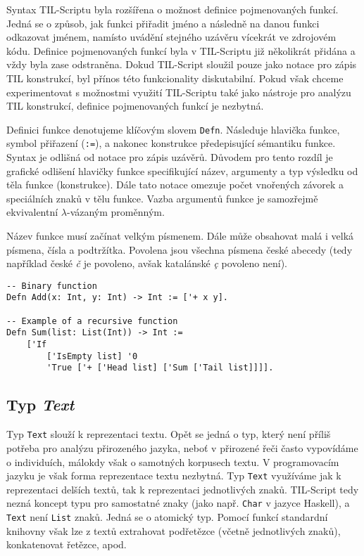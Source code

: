 Syntax TIL-Scriptu byla rozšířena o možnost definice pojmenovaných funkcí. Jedná se o způsob, jak
funkci přiřadit jméno a následně na danou funkci odkazovat jménem, namísto uvádění stejného uzávěru
vícekrát ve zdrojovém kódu. Definice pojmenovaných funkcí byla v TIL-Scriptu již několikrát přidána
a vždy byla zase odstraněna. Dokud TIL-Script sloužil pouze jako notace pro zápis TIL konstrukcí,
byl přínos této funkcionality diskutabilní. Pokud však chceme experimentovat s možnostmi využití
TIL-Scriptu také jako nástroje pro analýzu TIL konstrukcí, definice pojmenovaných funkcí je
nezbytná.

Definici funkce denotujeme klíčovým slovem \lstinline{Defn}. Následuje hlavička funkce, symbol
přiřazení (\lstinline{:=}), a nakonec konstrukce předepisující sémantiku funkce. Syntax je odlišná
od notace pro zápis uzávěrů. Důvodem pro tento rozdíl je grafické odlišení hlavičky funkce
specifikující název, argumenty a typ výsledku od těla funkce (konstrukce). Dále tato notace
omezuje počet vnořených závorek a speciálních znaků v tělu funkce. Vazba argumentů funkce je
samozřejmě ekvivalentní $\lambda$-vázaným proměnným.

Název funkce musí začínat velkým písmenem. Dále může obsahovat malá i velká písmena, čísla
a podtržítka. Povolena jsou všechna písmena české abecedy (tedy například české \textit{č} je
povoleno, avšak katalánské \textit{\c{c}} povoleno není).

\begin{lstlisting}[caption={Příklad definice funkcí}]
-- Binary function
Defn Add(x: Int, y: Int) -> Int := ['+ x y].

-- Example of a recursive function
Defn Sum(list: List(Int)) -> Int :=
    ['If
        ['IsEmpty list] '0
        'True ['+ ['Head list] ['Sum ['Tail list]]]].
\end{lstlisting}

\subsection{Typ \textit{Text}} \label{text-type}

Typ \lstinline{Text} slouží k reprezentaci textu. Opět se jedná o typ, který není příliš potřeba
pro analýzu přirozeného jazyka, neboť v přirozené řeči často vypovídáme o individuích, málokdy však
o samotných korpusech textu. V programovacím jazyku je však forma reprezentace textu nezbytná.
Typ \lstinline{Text} využíváme jak k reprezentaci delších textů, tak k reprezentaci jednotlivých
znaků. TIL-Script tedy nezná koncept typu pro samostatné znaky (jako např. \lstinline{Char} v jazyce
Haskell), a \lstinline{Text} není \lstinline{List} znaků. Jedná se o atomický typ. Pomocí funkcí
standardní knihovny však lze z textů extrahovat podřetězce (včetně jednotlivých znaků),
konkatenovat řetězce, apod.

